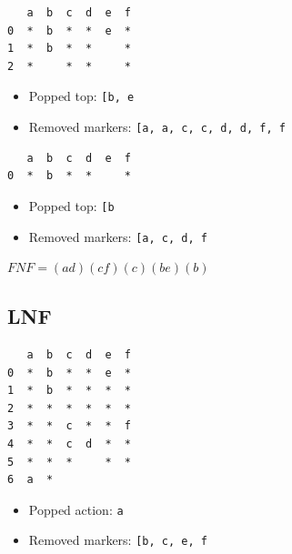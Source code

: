 \documentclass[11pt]{article}
\providecommand{\tightlist}{%
      \setlength{\itemsep}{0pt}\setlength{\parskip}{0pt}}
\begin{document}
\begin{verbatim}
   a  b  c  d  e  f
0  *  b  *  *  e  *
1  *  b  *  *     *
2  *     *  *     *
\end{verbatim}

\begin{itemize}
\tightlist
\item
  Popped top:
  \texttt{{[}\textquotesingle{}b\textquotesingle{},\ \textquotesingle{}e\textquotesingle{}{]}}
\item
  Removed markers:
  \texttt{{[}\textquotesingle{}a\textquotesingle{},\ \textquotesingle{}a\textquotesingle{},\ \textquotesingle{}c\textquotesingle{},\ \textquotesingle{}c\textquotesingle{},\ \textquotesingle{}d\textquotesingle{},\ \textquotesingle{}d\textquotesingle{},\ \textquotesingle{}f\textquotesingle{},\ \textquotesingle{}f\textquotesingle{}{]}}
\end{itemize}

\begin{verbatim}
   a  b  c  d  e  f
0  *  b  *  *     *
\end{verbatim}

\begin{itemize}
\tightlist
\item
  Popped top: \texttt{{[}\textquotesingle{}b\textquotesingle{}{]}}
\item
  Removed markers:
  \texttt{{[}\textquotesingle{}a\textquotesingle{},\ \textquotesingle{}c\textquotesingle{},\ \textquotesingle{}d\textquotesingle{},\ \textquotesingle{}f\textquotesingle{}{]}}
\end{itemize}

\(FNF = (ad)(cf)(c)(be)(b)\)

    \hypertarget{lnf}{%
\subsection{LNF}\label{lnf}}

\begin{verbatim}
   a  b  c  d  e  f
0  *  b  *  *  e  *
1  *  b  *  *  *  *
2  *  *  *  *  *  *
3  *  *  c  *  *  f
4  *  *  c  d  *  *
5  *  *  *     *  *
6  a  *            
\end{verbatim}

\begin{itemize}
\tightlist
\item
  Popped action: \texttt{a}
\item
  Removed markers:
  \texttt{{[}\textquotesingle{}b\textquotesingle{},\ \textquotesingle{}c\textquotesingle{},\ \textquotesingle{}e\textquotesingle{},\ \textquotesingle{}f\textquotesingle{}{]}}
\end{itemize}
\end{document}
